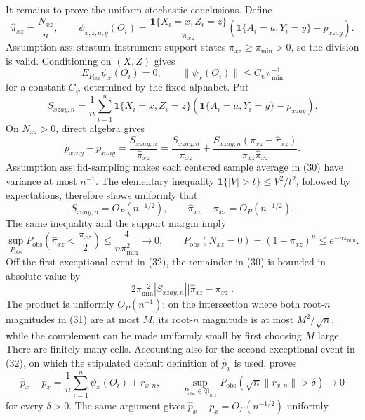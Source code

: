 It remains to prove the uniform stochastic conclusions.  Define
\[
 \widehat\pi_{xz}=\frac{N_{xz}}n,
 \qquad
 \psi_{x,z,a,y}(O_i)
 =\frac{\mathbf 1\{X_i=x,Z_i=z\}}{\pi_{xz}}
   \left(\mathbf 1\{A_i=a,Y_i=y\}-p_{xzay}\right).
 \tag{28}
\]
Assumption \(\mathrm{ass{:}stratum\mbox{-}instrument\mbox{-}support}\)
states \(\pi_{xz}\geq\pi_{\min}>0\), so the division is valid.  Conditioning
on \((X,Z)\) gives
\[
 E_{P_{\mathrm{obs}}}\psi_x(O_i)=0,
 \qquad
 \|\psi_x(O_i)\|\leq C_\psi\pi_{\min}^{-1}
 \tag{29}
\]
for a constant \(C_\psi\) determined by the fixed alphabet.  Put
\[
 S_{xzay,n}=\frac1n\sum_{i=1}^n
 \mathbf 1\{X_i=x,Z_i=z\}
 \left(\mathbf 1\{A_i=a,Y_i=y\}-p_{xzay}\right).
\]
On \(N_{xz}>0\), direct algebra gives
\[
 \widehat p_{xzay}-p_{xzay}
 =\frac{S_{xzay,n}}{\widehat\pi_{xz}}
 =\frac{S_{xzay,n}}{\pi_{xz}}
  +\frac{S_{xzay,n}(\pi_{xz}-\widehat\pi_{xz})}
         {\pi_{xz}\widehat\pi_{xz}}.
 \tag{30}
\]
Assumption \(\mathrm{ass{:}iid\mbox{-}sampling}\) makes each centered sample
average in (30) have variance at most \(n^{-1}\).  The elementary inequality
\(\mathbf 1\{|V|>t\}\leq V^2/t^2\), followed by expectations, therefore
shows uniformly that
\[
 S_{xzay,n}=O_P(n^{-1/2}),
 \qquad
 \widehat\pi_{xz}-\pi_{xz}=O_P(n^{-1/2}).
 \tag{31}
\]
The same inequality and the support margin imply
\[
 \sup_{P_{\mathrm{obs}}}
 P_{\mathrm{obs}}\!\left(\widehat\pi_{xz}<\frac{\pi_{xz}}2\right)
 \leq\frac{4}{n\pi_{\min}^2}\longrightarrow0,
 \qquad
 P_{\mathrm{obs}}(N_{xz}=0)
 =(1-\pi_{xz})^n\leq e^{-n\pi_{\min}}.
 \tag{32}
\]
Off the first exceptional event in (32), the remainder in (30) is bounded in
absolute value by
\[
 2\pi_{\min}^{-2}|S_{xzay,n}|
       |\widehat\pi_{xz}-\pi_{xz}|.
\]
The product is uniformly \(O_P(n^{-1})\): on the intersection where both
root-\(n\) magnitudes in (31) are at most \(M\), its root-\(n\) magnitude is
at most \(M^2/\sqrt n\), while the complement can be made uniformly small by
first choosing \(M\) large.  There are finitely many cells.  Accounting also
for the second exceptional event in (32), on which the stipulated default
definition of \(\widehat p_x\) is used, proves
\[
 \widehat p_x-p_x
 =\frac1n\sum_{i=1}^n\psi_x(O_i)+r_{x,n},
 \qquad
 \sup_{P_{\mathrm{obs}}\in\mathfrak P_{\kappa,\varepsilon}}
 P_{\mathrm{obs}}\!\left(\sqrt n\|r_{x,n}\|>\delta\right)
 \longrightarrow0
 \tag{33}
\]
for every \(\delta>0\).  The same argument gives
\(\widehat p_x-p_x=O_P(n^{-1/2})\) uniformly.

